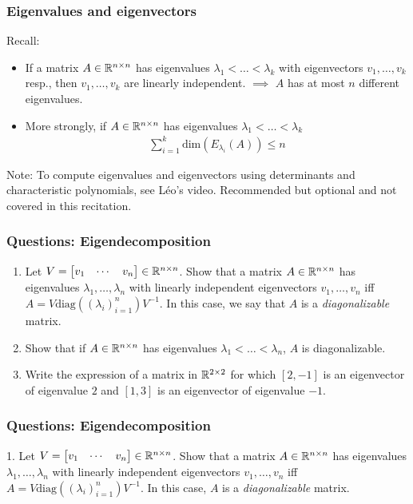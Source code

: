\documentclass{beamer}
\begin{document}
\begin{frame}[t]
\frametitle{Eigenvalues and eigenvectors}
Recall: 
\begin{itemize}
\item If a matrix $A \in \mathbb{R}^{n \times n}$ has eigenvalues $\lambda_1 < \dots < \lambda_k$ with eigenvectors $v_1, \dots, v_k$ resp., then $v_1, \dots, v_k$ are linearly independent. $\implies$ $A$ has at most $n$ different eigenvalues.
\item More strongly, if $A \in \mathbb{R}^{n \times n}$ has eigenvalues $\lambda_1 < \dots < \lambda_k$
\begin{align*}
\sum_{i=1}^k \text{dim}(E_{\lambda_i}(A)) \leq n
\end{align*}
\end{itemize}
Note: To compute eigenvalues and eigenvectors using determinants and characteristic polynomials, see L\'eo's video. Recommended but optional and not covered in this recitation.
\end{frame}

\begin{frame}[t]
\frametitle{Questions: Eigendecomposition}
\begin{enumerate}
\item Let $V = \begin{bmatrix} v_1 & \cdots & v_n \end{bmatrix} \in \mathbb{R}^{n \times n}$. Show that a matrix $A \in \mathbb{R}^{n \times n}$ has eigenvalues $\lambda_1, \dots, \lambda_n$ with linearly independent eigenvectors $v_1, \dots, v_n$ iff $A = V \text{diag}((\lambda_i)_{i=1}^n) V^{-1}$. In this case, we say that $A$ is a \emph{diagonalizable} matrix.
\item Show that if $A \in \mathbb{R}^{n \times n}$ has eigenvalues $\lambda_1 < \dots < \lambda_n$, $A$ is diagonalizable.
\item Write the expression of a matrix in $\mathbb{R}^{2 \times 2}$ for which $[2,-1]$ is an eigenvector of eigenvalue $2$ and $[1,3]$ is an eigenvector of eigenvalue $-1$.
\end{enumerate}
\end{frame}

\begin{frame}[t]
\frametitle{Questions: Eigendecomposition}
1. Let $V = \begin{bmatrix} v_1 & \cdots & v_n \end{bmatrix} \in \mathbb{R}^{n \times n}$. Show that a matrix $A \in \mathbb{R}^{n \times n}$ has eigenvalues $\lambda_1, \dots, \lambda_n$ with linearly independent eigenvectors $v_1, \dots, v_n$ iff $A = V \text{diag}((\lambda_i)_{i=1}^n) V^{-1}$. In this case, $A$ is a \emph{diagonalizable} matrix.
\pause
\end{frame}
\end{document}
